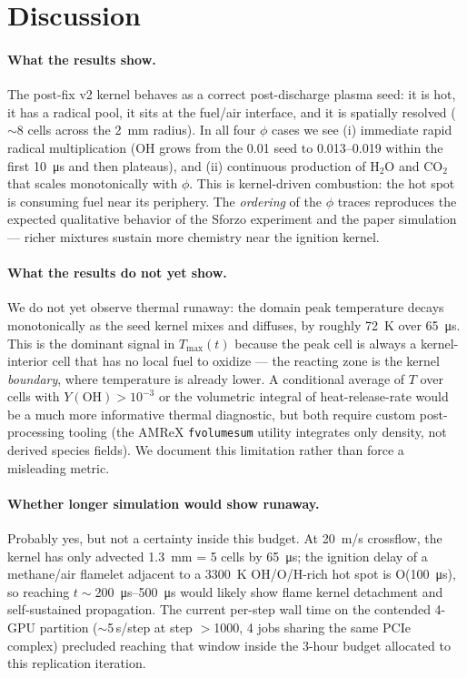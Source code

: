 \documentclass[11pt,a4paper]{article}
\begin{document}
\section{Discussion}

\paragraph{What the results show.}
The post-fix v2 kernel behaves as a correct post-discharge plasma seed: it is hot, it has a
radical pool, it sits at the fuel/air interface, and it is spatially resolved ($\sim$8
cells across the \SI{2}{mm} radius). In all four $\phi$ cases we see (i) immediate rapid radical
multiplication (OH grows from the 0.01 seed to 0.013--0.019 within the first \SI{10}{\micro s} and then plateaus),
and (ii) continuous production of H$_2$O and CO$_2$ that scales monotonically with $\phi$. This is
kernel-driven combustion: the hot spot is consuming fuel near its periphery.
The \emph{ordering} of the $\phi$ traces reproduces the expected qualitative behavior of the Sforzo
experiment and the paper simulation --- richer mixtures sustain more chemistry near the ignition
kernel.

\paragraph{What the results do not yet show.}
We do not yet observe thermal runaway: the domain peak temperature decays monotonically as the
seed kernel mixes and diffuses, by roughly \SI{72}{K} over \SI{65}{\micro s}. This is the dominant
signal in $T_{\max}(t)$ because the peak cell is always a kernel-interior cell that has no local
fuel to oxidize --- the reacting zone is the kernel \emph{boundary}, where temperature is already
lower. A conditional average of $T$ over cells with $Y(\mathrm{OH}) > 10^{-3}$ or the volumetric
integral of heat-release-rate would be a much more informative thermal diagnostic, but both require
custom post-processing tooling (the AMReX \texttt{fvolumesum} utility integrates only density, not
derived species fields). We document this limitation rather than force a misleading metric.

\paragraph{Whether longer simulation would show runaway.}
Probably yes, but not a certainty inside this budget. At \SI{20}{m/s} crossflow, the kernel has
only advected \SI{1.3}{mm} = 5 cells by \SI{65}{\micro s}; the ignition delay of a methane/air flamelet
adjacent to a \SI{3300}{K} OH/O/H-rich hot spot is O(\SI{100}{\micro s}), so reaching
$t \sim $\SI{200}{\micro s}--\SI{500}{\micro s} would likely show flame kernel detachment and
self-sustained propagation. The current per-step wall time on the contended 4-GPU partition
($\sim$5\,s/step at step $>$1000, 4 jobs sharing the same PCIe complex) precluded reaching that
window inside the 3-hour budget allocated to this replication iteration.
\end{document}
